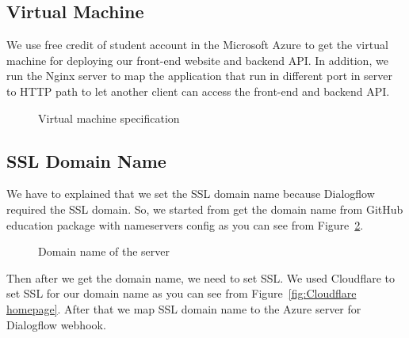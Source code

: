 \documentclass[12pt,oneside,openright,a4paper]{cpe-english-project}
\begin{document}
\subsection{Virtual Machine}
We use free credit of student account in the Microsoft Azure to get
the virtual machine for deploying our front-end website and backend API.
In addition, we run the Nginx server to map the application that run in
different port in server to HTTP path to let another client can access the
front-end and backend API.
\begin{figure}[!h]\centering
	\caption{Virtual machine specification}\label{fig:Virtual machine specification}
\end{figure}

\pagebreak
\subsection{SSL Domain Name}
We have to explained that we set the SSL domain name because
Dialogflow required the SSL domain. So, we started from get
the domain name from GitHub education package 
with nameservers config as you can see from Figure~\ref*{fig:Domain name of the server}.
\begin{figure}[!h]\centering
	\caption{Domain name of the server}\label{fig:Domain name of the server}
\end{figure}
Then after we get the domain name, we need to set SSL.
We used Cloudflare to set SSL for our domain name as you can see from Figure~\ref*{fig:Cloudflare homepage}.
After that we map SSL domain name to the Azure server for Dialogflow webhook.
\end{document}
